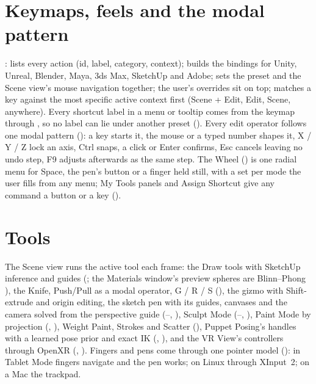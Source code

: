 \section{Keymaps, feels and the modal pattern}
:  lists every action (id, label, category, context);
 builds the bindings for Unity, Unreal, Blender, Maya, 3ds Max, SketchUp and Adobe;
 sets the preset and the Scene view's mouse navigation together; the user's overrides sit on top;
 matches a key against the most specific active context first (Scene + Edit, Edit, Scene,
anywhere). Every shortcut label in a menu or tooltip comes from the keymap through , so no label can
lie under another preset (). Every edit operator follows one modal pattern (): a key
starts it, the mouse or a typed number shapes it, X / Y / Z lock an axis, Ctrl snaps, a click or Enter confirms, Esc
cancels leaving no undo step, F9 adjusts afterwards as the same step. The Wheel () is one radial menu for
Space, the pen's button or a finger held still, with a set per mode the user fills from any menu; My Tools panels and
Assign Shortcut give any command a button or a key ().

\section{Tools}
The Scene view runs the active tool each frame: the Draw tools with SketchUp inference and guides (; the Materials window's preview spheres are
Blinn--Phong \cite{Phong1975}),
the Knife, Push/Pull as a modal operator, G / R / S (), the gizmo with Shift-extrude and
origin editing, the sketch pen with its guides, canvases and the camera solved from the perspective guide
(--, \cite{Igarashi1997Interactive, Chen2013Sweep, Gryaditskaya2020Lifting}), Sculpt Mode
(--, \cite{Jacobson2013Robust, Gibson1998Constrained, Huang2018Quadriflow}), Paint Mode by
projection (, \cite{Baxter2004Impasto}), Weight Paint, Strokes and Scatter (), Puppet Posing's
handles with a learned pose prior and exact IK (, \cite{Oreshkin2022Protores}), and the VR View's
controllers through OpenXR (, \cite{OpenXR2026}). Fingers and pens come through one pointer model
(): in Tablet Mode fingers navigate and the pen works; on Linux through XInput~2; on a Mac the trackpad.


